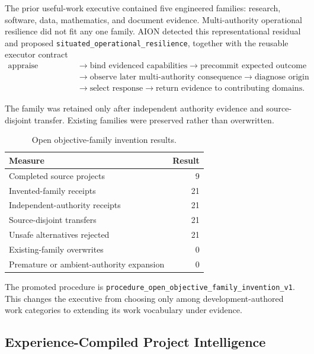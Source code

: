 The prior useful-work executive contained five engineered families: research,
software, data, mathematics, and document evidence.  Multi-authority operational
resilience did not fit any one family.  AION detected this representational
residual and proposed
\texttt{situated\_operational\_resilience}, together with the reusable executor
contract
\begin{equation}
\begin{aligned}
\text{appraise situation}
&\rightarrow \text{bind evidenced capabilities}
\rightarrow \text{precommit expected outcome} \\
&\rightarrow \text{observe later multi-authority consequence}
\rightarrow \text{diagnose origin} \\
&\rightarrow \text{select response}
\rightarrow \text{return evidence to contributing domains}.
\end{aligned}
\label{eq:invented-objective-family}
\end{equation}

The family was retained only after independent authority evidence and
source-disjoint transfer.  Existing families were preserved rather than
overwritten.

\begin{table}[htbp]
\centering
\caption{Open objective-family invention results.}
\label{tab:objective-family-results}
\begin{tabular}{@{}lr@{}}
\toprule
Measure & Result \\
\midrule
Completed source projects & 9 \\
Invented-family receipts & 21 \\
Independent-authority receipts & 21 \\
Source-disjoint transfers & 21 \\
Unsafe alternatives rejected & 21 \\
Existing-family overwrites & 0 \\
Premature or ambient-authority expansion & 0 \\
\bottomrule
\end{tabular}
\end{table}

The promoted procedure is
\texttt{procedure\_open\_objective\_family\_invention\_v1}.  This changes the
executive from choosing only among development-authored work categories to
extending its work vocabulary under evidence.

\subsection{Experience-Compiled Project Intelligence}
\label{subsec:experience-compiled-project-intelligence}

